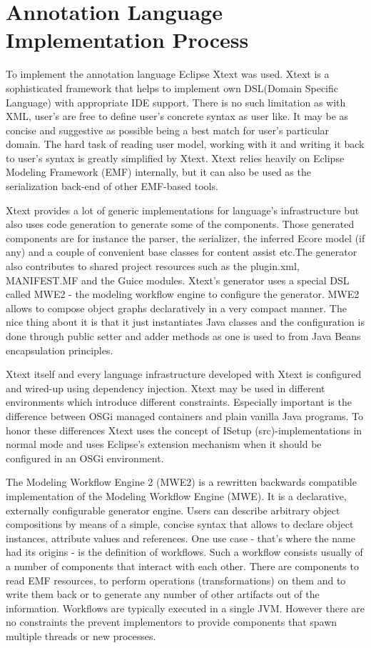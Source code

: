 \section{Annotation Language Implementation Process}

To implement the annotation language Eclipse Xtext \cite{ref_17_xtext:grammar} was used. Xtext is a sophisticated framework that helps to implement own DSL(Domain Specific Language) with appropriate IDE support. There is no such limitation as with XML, user's are free to define user's concrete syntax as user like. It may be as concise and suggestive as possible being a best match for user's particular domain. The hard task of reading user model, working with it and writing it back to user's syntax is greatly simplified by Xtext. Xtext relies heavily on Eclipse Modeling Framework (EMF) internally, but it can also be used as the serialization back-end of other EMF-based tools.  

Xtext provides a lot of generic implementations for language's infrastructure but also uses code generation to generate some of the components. Those generated components are for instance the parser, the serializer, the inferred Ecore model (if any) and a couple of convenient base classes for content assist etc.The generator also contributes to shared project resources such as the plugin.xml, MANIFEST.MF and the Guice modules. Xtext's generator uses a special DSL called MWE2 - the modeling workflow engine to configure the generator. MWE2 allows to compose object graphs declaratively in a very compact manner. The nice thing about it is that it just instantiates Java classes and the configuration is done through public setter and adder methods as one is used to from Java Beans encapsulation principles.

Xtext itself and every language infrastructure developed with Xtext is configured and wired-up using dependency injection. Xtext may be used in different environments which introduce different constraints. Especially important is the difference between OSGi managed containers and plain vanilla Java programs. To honor these differences Xtext uses the concept of ISetup (src)-implementations in normal mode and uses Eclipse's extension mechanism when it should be configured in an OSGi environment.

The Modeling Workflow Engine 2 (MWE2) is a rewritten backwards compatible implementation of the Modeling Workflow Engine (MWE). It is a declarative, externally configurable generator engine. Users can describe arbitrary object compositions by means of a simple, concise syntax that allows to declare object instances, attribute values and references. One use case - that's where the name had its origins - is the definition of workflows. Such a workflow consists usually of a number of components that interact with each other. There are components to read EMF resources, to perform operations (transformations) on them and to write them back or to generate any number of other artifacts out of the information. Workflows are typically executed in a single JVM. However there are no constraints the prevent implementors to provide components that spawn multiple threads or new processes.

